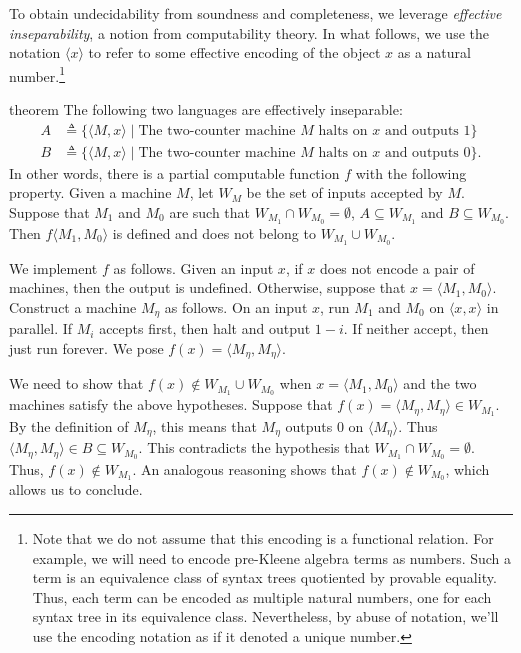 \documentclass[11pt,a4paper]{amsart}
\theoremstyle{definition}
\begin{document}
To obtain undecidability from soundness and completeness, we leverage
\emph{effective inseparability}, a notion from computability theory.  In what
follows, we use the notation $ \langle x \rangle $ to refer to some effective
encoding of the object $x$ as a natural number.\footnote{%
  Note that we do not assume that this encoding is a functional relation. For
  example, we will need to encode pre-Kleene algebra terms as numbers.  Such a
  term is an equivalence class of syntax trees quotiented by provable equality.
  Thus, each term can be encoded as multiple natural numbers, one for each
  syntax tree in its equivalence class.  Nevertheless, by abuse of notation,
  we'll use the encoding notation as if it denoted a unique number.}

\begin{theoremEnd}{theorem}
  \label{thm:basic-inseparability}
  The following two languages are effectively inseparable:
  \begin{align*}
    A &  \triangleq  \{  \langle  M ,x \rangle   \mid  \text{The two-counter machine $M$ halts on $x$ and outputs 1}\} \\
    B &  \triangleq  \{  \langle  M ,x \rangle   \mid  \text{The two-counter machine $M$ halts on $x$ and outputs 0}\}.
  \end{align*}
  In other words, there is a partial computable function $f$ with the following
  property.  Given a machine $M$, let $W_M$ be the set of inputs accepted by
  $M$.  Suppose that $M_1$ and $M_0$ are such that
  $W_{M_1} \cap W_{M_0} = \emptyset$, $A \subseteq W_{M_1}$ and
  $B \subseteq W_{M_0}$.  Then $f\langle M_1, M_0 \rangle$ is defined and does
  not belong to $W_{M_1} \cup W_{M_0}$.
\end{theoremEnd}

\begin{proofEnd}
  We implement $f$ as follows. Given an input $x$, if $x$ does not encode a pair
  of machines, then the output is undefined.  Otherwise, suppose that
  $x = \langle M_1, M_0 \rangle$.  Construct a machine $M_\eta$ as follows.  On
  an input $x$, run $M_1$ and $M_0$ on $\langle x, x \rangle$ in parallel.  If
  $M_i$ accepts first, then halt and output $1 - i$. If neither accept, then
  just run forever.  We pose $f(x) = \langle M_\eta, M_\eta \rangle$.

  We need to show that $f(x) \notin W_{M_1} \cup W_{M_0}$ when
  $x = \langle M_1, M_0\rangle$ and the two machines satisfy the above
  hypotheses.  Suppose that $f(x) = \langle M_\eta, M_\eta \rangle \in W_{M_1}$.
  By the definition of $M_\eta$, this means that $M_\eta$ outputs 0 on
  $\langle M_\eta \rangle$.  Thus
  $\langle M_\eta, M_\eta \rangle \in B \subseteq W_{M_0}$. This contradicts the
  hypothesis that $W_{M_1} \cap W_{M_0} = \emptyset$.  Thus,
  $f(x) \notin W_{M_1}$.  An analogous reasoning shows that
  $f(x) \notin W_{M_0}$, which allows us to conclude.
\end{proofEnd}
\end{document}
